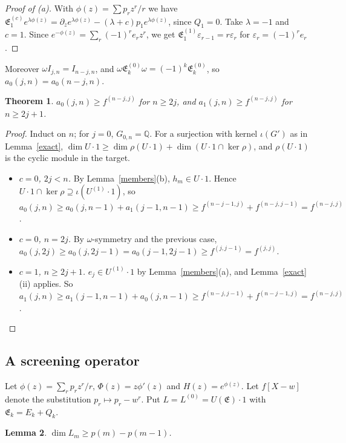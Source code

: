 \documentclass[11pt]{article}
\newtheorem{theorem}{Theorem}
\newtheorem{lemma}[theorem]{Lemma}
\theoremstyle{definition}
\theoremstyle{remark}
\newcommand{\Q}{\mathbb{Q}}
\newcommand{\fE}{\mathfrak{E}}
\begin{document}
\begin{proof}[Proof of (a)]
With $\phi(z)=\sum p_rz^r/r$ we have $\fE^{(c)}_1e^{\lambda\phi(z)}=\partial_ze^{\lambda\phi(z)}-(\lambda+c)p_1
e^{\lambda\phi(z)}$, since $Q_1=0$. Take $\lambda=-1$ and $c=1$. Since $e^{-\phi(z)}=\sum_r(-1)^re_rz^r$, we get
$\fE^{(1)}_1\varepsilon_{r-1}=r\varepsilon_r$ for $\varepsilon_r=(-1)^re_r$.
\end{proof}

Moreover $\omega I_{j,n}=I_{n-j,n}$, and $\omega\fE^{(0)}_k\omega=(-1)^k\fE^{(0)}_k$, so $a_0(j,n)=a_0(n-j,n)$.

\begin{theorem}\label{induction}
$a_0(j,n)\ge f^{(n-j,j)}$ for $n\ge2j$, and $a_1(j,n)\ge f^{(n-j,j)}$ for $n\ge2j+1$.
\end{theorem}

\begin{proof}
Induct on $n$; for $j=0$, $G_{0,n}=\Q$. For a surjection with kernel $\iota(G')$ as in Lemma~\ref{exact},
$\dim U\cdot1\ge\dim\rho(U\cdot1)+\dim(U\cdot1\cap\ker\rho)$, and $\rho(U\cdot1)$ is the cyclic module in the target.
\begin{itemize}
\item \emph{$c=0$, $2j<n$.} By Lemma~\ref{members}(b), $h_m\in U\cdot1$. Hence $U\cdot1\cap\ker\rho\supseteq
\iota(U^{(1)}\cdot1)$, so $a_0(j,n)\ge a_0(j,n-1)+a_1(j-1,n-1)\ge f^{(n-j-1,j)}+f^{(n-j,j-1)}=f^{(n-j,j)}$.
\item \emph{$c=0$, $n=2j$.} By $\omega$-symmetry and the previous case,
$a_0(j,2j)\ge a_0(j,2j-1)=a_0(j-1,2j-1)\ge f^{(j,j-1)}=f^{(j,j)}$.
\item \emph{$c=1$, $n\ge2j+1$.} $e_j\in U^{(1)}\cdot1$ by Lemma~\ref{members}(a), and Lemma~\ref{exact}(ii) applies.
So $a_1(j,n)\ge a_1(j-1,n-1)+a_0(j,n-1)\ge f^{(n-j,j-1)}+f^{(n-j-1,j)}=f^{(n-j,j)}$.
\end{itemize}
\end{proof}

\subsection{A screening operator}

Let $\phi(z)=\sum_rp_rz^r/r$, $\Phi(z)=z\phi'(z)$ and $H(z)=e^{\phi(z)}$. Let $f[X-w]$ denote the substitution
$p_r\mapsto p_r-w^r$. Put $L=L^{(0)}=U(\fE)\cdot1$ with $\fE_k=E_k+Q_k$.

\begin{lemma}\label{lowerdim}
$\dim L_m\ge p(m)-p(m-1)$.
\end{lemma}
\end{document}
